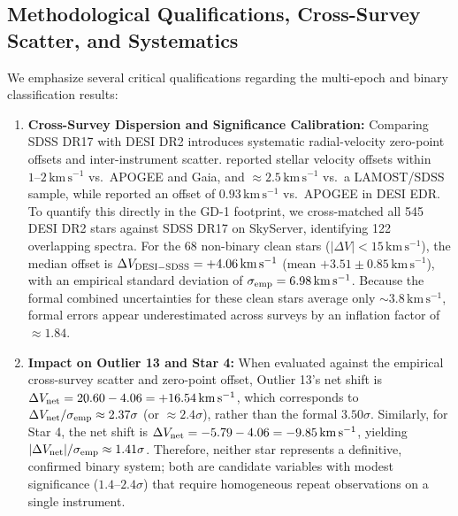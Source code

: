 \documentclass[twocolumn]{aastex631}
\begin{document}
\subsection{Methodological Qualifications, Cross-Survey Scatter, and Systematics}
We emphasize several critical qualifications regarding the multi-epoch and binary classification results:
\begin{enumerate}
\item \textbf{Cross-Survey Dispersion and Significance Calibration:} Comparing SDSS DR17 with DESI DR2 introduces systematic radial-velocity zero-point offsets and inter-instrument scatter. \citet{Cooper2023} reported stellar velocity offsets within $1\text{--}2\,\mathrm{km\,s^{-1}}$ vs.\ APOGEE and Gaia, and $\approx 2.5\,\mathrm{km\,s^{-1}}$ vs.\ a LAMOST/SDSS sample, while \citet{Koposov2024} reported an offset of $0.93\,\mathrm{km\,s^{-1}}$ vs.\ APOGEE in DESI EDR. To quantify this directly in the GD-1 footprint, we cross-matched all 545 DESI DR2 stars against SDSS DR17 on SkyServer, identifying 122 overlapping spectra. For the 68 non-binary clean stars ($|\Delta V| < 15\,\mathrm{km\,s^{-1}}$), the median offset is $\Delta V_{\rm DESI-SDSS} = +4.06\,\mathrm{km\,s^{-1}}$ (mean $+3.51 \pm 0.85\,\mathrm{km\,s^{-1}}$), with an empirical standard deviation of $\sigma_{\rm emp} = 6.98\,\mathrm{km\,s^{-1}}$. Because the formal combined uncertainties for these clean stars average only $\sim 3.8\,\mathrm{km\,s^{-1}}$, formal errors appear underestimated across surveys by an inflation factor of $\approx 1.84$.
\item \textbf{Impact on Outlier 13 and Star 4:} When evaluated against the empirical cross-survey scatter and zero-point offset, Outlier 13's net shift is $\Delta V_{\rm net} = 20.60 - 4.06 = +16.54\,\mathrm{km\,s^{-1}}$, which corresponds to $\Delta V_{\rm net} / \sigma_{\rm emp} \approx 2.37\sigma$ (or $\approx 2.4\sigma$), rather than the formal $3.50\sigma$. Similarly, for Star 4, the net shift is $\Delta V_{\rm net} = -5.79 - 4.06 = -9.85\,\mathrm{km\,s^{-1}}$, yielding $|\Delta V_{\rm net}| / \sigma_{\rm emp} \approx 1.41\sigma$. Therefore, neither star represents a definitive, confirmed binary system; both are candidate variables with modest significance ($1.4\text{--}2.4\sigma$) that require homogeneous repeat observations on a single instrument.

\end{enumerate}
\end{document}
